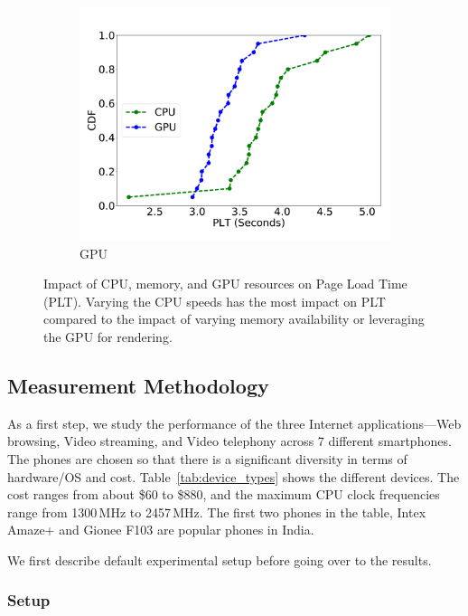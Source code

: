 \begin{figure}[t]
\begin{subfigure}[b]{0.33\textwidth}
        \includegraphics[width=1\linewidth]{sections/device-work/plt-gpu}
        \caption{GPU}
    \end{subfigure}
     \caption{Impact of CPU, memory, and GPU resources on Page Load Time (PLT). Varying the CPU speeds has the most impact on PLT compared to the impact of varying memory availability or leveraging the GPU for rendering. }
     \vspace{-0.2in}
     \label{fig:isolation}
\end{figure}


\subsection{Measurement Methodology} 
\label{sec:motivation}

As a first step, we study the performance of the three Internet applications---Web browsing, Video streaming, and Video telephony across 7  different smartphones. 
The phones are chosen so that there is a significant
diversity in terms of hardware/OS and cost. Table~\ref{tab:device_types} shows the different devices. The cost ranges from  about \$60 to \$880, and the maximum CPU clock frequencies range from 1300\,MHz to 2457\,MHz. The first two phones in the table, Intex Amaze+ and Gionee F103 are popular phones in India.

We first describe default experimental setup 
before going over to the results.

\subsubsection{Setup}
\label{sec:setup}


